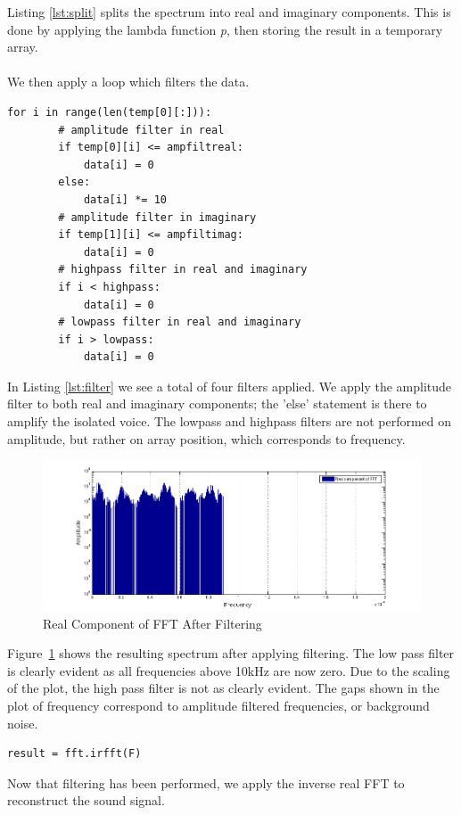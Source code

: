 Listing \ref{lst:split} splits the spectrum into real and imaginary components. This is done by applying the lambda function \emph{p}, then storing the result in a temporary array.
\\\\
We then apply a loop which filters the data.
\begin{lstlisting}[caption={Filter Application},label=lst:filter,firstnumber=21]
    for i in range(len(temp[0][:])):
        # amplitude filter in real
        if temp[0][i] <= ampfiltreal:
            data[i] = 0
        else:
            data[i] *= 10
        # amplitude filter in imaginary
        if temp[1][i] <= ampfiltimag:
            data[i] = 0
        # highpass filter in real and imaginary
        if i < highpass:
            data[i] = 0
        # lowpass filter in real and imaginary
        if i > lowpass:
            data[i] = 0
\end{lstlisting}
In Listing \ref{lst:filter} we see a total of four filters applied. We apply the amplitude filter to both real and imaginary components; the 'else' statement is there to amplify the isolated voice. The lowpass and highpass filters are not performed on amplitude, but rather on array position, which corresponds to frequency. 

\begin{figure}[H]
    \centering
        \includegraphics[width=6.5in]{./include/afterfig.png}
    \caption{Real Component of FFT After Filtering}
    \label{fig:afterFilt}
\end{figure}\noindent
Figure~\ref{fig:afterFilt} shows the resulting spectrum after applying filtering. The low pass filter is clearly evident as all frequencies above 10kHz are now zero. Due to the scaling of the plot, the high pass filter is not as clearly evident. The gaps shown in the plot of frequency correspond to amplitude filtered frequencies, or background noise.
\begin{lstlisting}[caption={Inverse Real FFT},label=lst:irfft,firstnumber=57]
    result = fft.irfft(F)
\end{lstlisting}
Now that filtering has been performed, we apply the inverse real FFT to reconstruct the sound signal.
